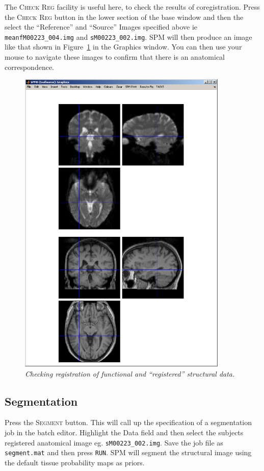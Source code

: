 The \textsc{Check Reg} facility is useful here, to check the results of coregistration. Press the \textsc{Check Reg} button in the lower section of the base window and then the select the ``Reference'' and ``Source'' Images specified above ie \texttt{meanfM00223\_004.img} and \texttt{sM00223\_002.img}. SPM will then produce an image like that shown in Figure~\ref{aud_checkreg} in the Graphics window. You can then use your mouse to navigate these images to confirm that there is an anatomical correspondence.

\begin{figure}
\begin{center}
\includegraphics[width=100mm]{auditory/checkreg}
\caption{\em Checking registration of functional and ``registered'' structural data. \label{aud_checkreg}}
\end{center}
\end{figure}

\subsection{Segmentation}

Press the \textsc{Segment} button. This will call up the specification of a segmentation job in the batch editor. Highlight the Data field and then select the subjects registered anatomical image eg. \texttt{sM00223\_002.img}. Save the job file as \texttt{segment.mat} and then press \texttt{RUN}. SPM will segment the structural image using the default tissue probability maps as priors. 

